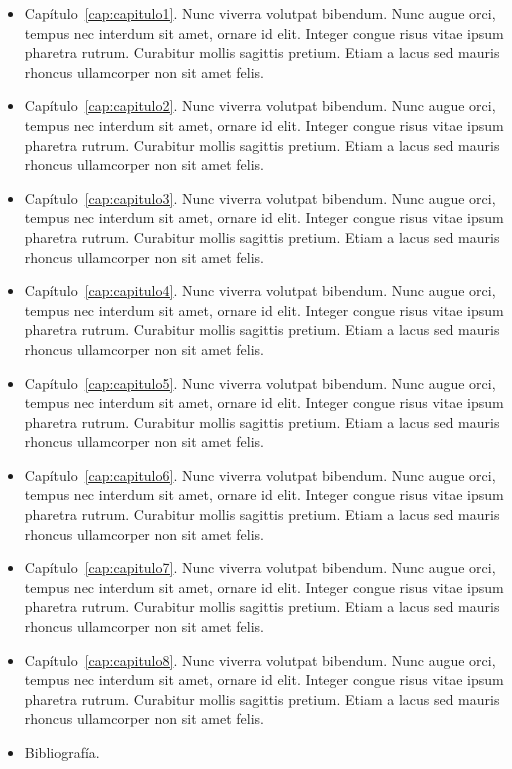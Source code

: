 \begin{itemize}
	\item Capítulo~\ref{cap:capitulo1}. Nunc viverra volutpat bibendum. Nunc augue orci, tempus nec interdum sit amet, ornare id elit. Integer congue risus vitae ipsum pharetra rutrum. Curabitur mollis sagittis pretium. Etiam a lacus sed mauris rhoncus ullamcorper non sit amet felis.
	\item Capítulo~\ref{cap:capitulo2}. Nunc viverra volutpat bibendum. Nunc augue orci, tempus nec interdum sit amet, ornare id elit. Integer congue risus vitae ipsum pharetra rutrum. Curabitur mollis sagittis pretium. Etiam a lacus sed mauris rhoncus ullamcorper non sit amet felis.
	\item Capítulo~\ref{cap:capitulo3}. Nunc viverra volutpat bibendum. Nunc augue orci, tempus nec interdum sit amet, ornare id elit. Integer congue risus vitae ipsum pharetra rutrum. Curabitur mollis sagittis pretium. Etiam a lacus sed mauris rhoncus ullamcorper non sit amet felis.
	\item Capítulo~\ref{cap:capitulo4}. Nunc viverra volutpat bibendum. Nunc augue orci, tempus nec interdum sit amet, ornare id elit. Integer congue risus vitae ipsum pharetra rutrum. Curabitur mollis sagittis pretium. Etiam a lacus sed mauris rhoncus ullamcorper non sit amet felis.
	\item Capítulo~\ref{cap:capitulo5}. Nunc viverra volutpat bibendum. Nunc augue orci, tempus nec interdum sit amet, ornare id elit. Integer congue risus vitae ipsum pharetra rutrum. Curabitur mollis sagittis pretium. Etiam a lacus sed mauris rhoncus ullamcorper non sit amet felis.
	\item Capítulo~\ref{cap:capitulo6}. Nunc viverra volutpat bibendum. Nunc augue orci, tempus nec interdum sit amet, ornare id elit. Integer congue risus vitae ipsum pharetra rutrum. Curabitur mollis sagittis pretium. Etiam a lacus sed mauris rhoncus ullamcorper non sit amet felis.
	\item Capítulo~\ref{cap:capitulo7}. Nunc viverra volutpat bibendum. Nunc augue orci, tempus nec interdum sit amet, ornare id elit. Integer congue risus vitae ipsum pharetra rutrum. Curabitur mollis sagittis pretium. Etiam a lacus sed mauris rhoncus ullamcorper non sit amet felis.
	\item Capítulo~\ref{cap:capitulo8}. Nunc viverra volutpat bibendum. Nunc augue orci, tempus nec interdum sit amet, ornare id elit. Integer congue risus vitae ipsum pharetra rutrum. Curabitur mollis sagittis pretium. Etiam a lacus sed mauris rhoncus ullamcorper non sit amet felis.
	\item Bibliografía.
\end{itemize}
